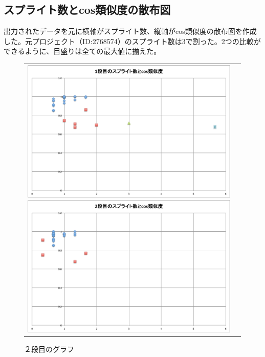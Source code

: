 \documentclass[a4paper,10pt,onecolumn,oneside,openany]{jsbook}
\begin{document}
\subsection{スプライト数とcos類似度の散布図}
 出力されたデータを元に横軸がスプライト数、縦軸がcos類似度の散布図を作成した。元プロジェクト（ID:2768574）のスプライト数は3で割った。2つの比較ができるように、目盛りは全ての最大値に揃えた。

\begin{figure}[h]
 \begin{tabular}{cc}
 	\begin{minipage}[t]{0.45\hsize}
	 \centering
	 \includegraphics[keepaspectratio, scale = 0.25]{mazegame_first_splite.pdf}
	 \caption{１段目のグラフ}
	 \label{mazegame_first_splite_cos}
	\end{minipage}
        \begin{minipage}[t]{0.45\hsize}
	 \centering
	 \includegraphics[keepaspectratio, scale = 0.25]{mazegame_second_splite.pdf}
	 \caption{２段目のグラフ}
	 \label{mazegame_second_splite_cos}
	\end{minipage}
 \end{tabular}
 \end{figure}
 
\end{document}
